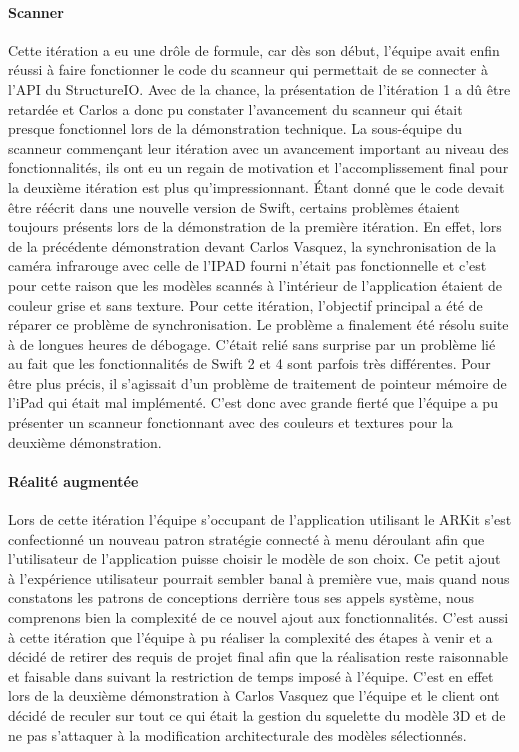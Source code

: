 \documentclass[rapport.tex]{subfiles}
\begin{document}
\paragraph*{Scanner}
Cette itération a eu une drôle de formule, car dès son début, l’équipe avait enfin réussi à faire fonctionner le code du scanneur qui permettait de se connecter à l’API du StructureIO. Avec de la chance, la présentation de l’itération 1 a dû être retardée et Carlos a donc pu constater l’avancement du scanneur qui était presque fonctionnel lors de la démonstration technique. La sous-équipe du scanneur commençant leur itération avec un avancement important au niveau des fonctionnalités, ils ont eu un regain de motivation et l’accomplissement final pour la deuxième itération est plus qu’impressionnant. Étant donné que le code devait être réécrit dans une nouvelle version de Swift, certains problèmes étaient toujours présents lors de la démonstration de la première itération. En effet, lors de la précédente démonstration devant Carlos Vasquez, la synchronisation de la caméra infrarouge avec celle de l’IPAD fourni n’était pas fonctionnelle et c’est pour cette raison que les modèles scannés à l’intérieur de l’application étaient de couleur grise et sans texture. Pour cette itération, l’objectif principal a été de réparer ce problème de synchronisation. Le problème a finalement été résolu suite à de longues heures de débogage. C’était relié sans surprise par un problème lié au fait que les fonctionnalités de Swift 2 et 4 sont parfois très différentes. Pour être plus précis, il s’agissait d’un problème de traitement de pointeur mémoire de l’iPad qui était mal implémenté. C’est donc avec grande fierté que l’équipe a pu présenter un scanneur fonctionnant avec des couleurs et textures pour la deuxième démonstration.
\paragraph*{Réalité augmentée}
Lors de cette itération l’équipe s’occupant de l’application utilisant le ARKit s’est confectionné un nouveau patron stratégie connecté à menu déroulant afin que l’utilisateur de l’application puisse choisir le modèle de son choix. Ce petit ajout à l’expérience utilisateur pourrait sembler banal à première vue, mais quand nous constatons les patrons de conceptions derrière tous ses appels système, nous comprenons bien la complexité de ce nouvel ajout aux fonctionnalités. C’est aussi à cette itération que l’équipe à pu réaliser la complexité des étapes à venir et a décidé de retirer des requis de projet final afin que la réalisation reste raisonnable et faisable dans suivant la restriction de temps imposé à l’équipe. C’est en effet lors de la deuxième démonstration à Carlos Vasquez que l’équipe et le client ont décidé de reculer sur tout ce qui était la gestion du squelette du modèle 3D et de ne pas s’attaquer à la modification architecturale des modèles sélectionnés.
\end{document}
